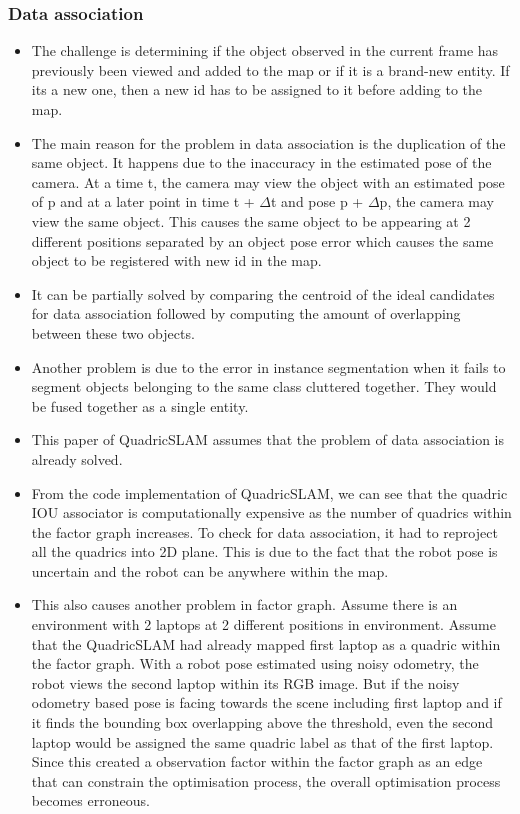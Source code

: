 \documentclass{article}
\begin{document}
\subsubsection{Data association}
\begin{itemize}
\item The challenge is determining if the object observed in the current frame has previously been viewed and added to the map or if it is a brand-new entity. If its a new one, then a new id has to be assigned to it before adding to the map.
\item The main reason for the problem in data association is the duplication of the same object. It happens due to the inaccuracy in the estimated pose of the camera. At a time t, the camera may view the object with an estimated pose of p and at a later point in time t + $\Delta$t and pose p + $\Delta$p, the camera may view the same object. This causes the same object to be appearing at 2 different positions separated by an object pose error which causes the same object to be registered with new id in the map.
\item It can be partially solved by comparing the centroid of the ideal candidates for data association followed by computing the amount of overlapping between these two objects.
\item Another problem is due to the error in instance segmentation when it fails to segment objects belonging to the same class cluttered together. They would be fused together as a single entity.
\item This paper of QuadricSLAM\cite{sünderhauf2017dual} assumes that the problem of data association is already solved.
\item From the code implementation of QuadricSLAM, we can see that the quadric IOU associator is computationally expensive as the number of quadrics within the factor graph increases. To check for data association, it had to reproject all the quadrics into 2D plane. This is due to the fact that the robot pose is uncertain and the robot can be anywhere within the map.
\item This also causes another problem in factor graph. Assume there is an environment with 2 laptops at 2 different positions in environment. Assume that the QuadricSLAM had already mapped first laptop as a quadric within the factor graph. With a robot pose estimated using noisy odometry, the robot views the second laptop within its RGB image. But if the noisy odometry based pose is facing towards the scene including first laptop and if it finds the bounding box overlapping above the threshold, even the second laptop would be assigned the same quadric label as that of the first laptop. Since this created a observation factor within the factor graph as an edge that can constrain the optimisation process, the overall optimisation process becomes erroneous.

\end{itemize}
\end{document}
